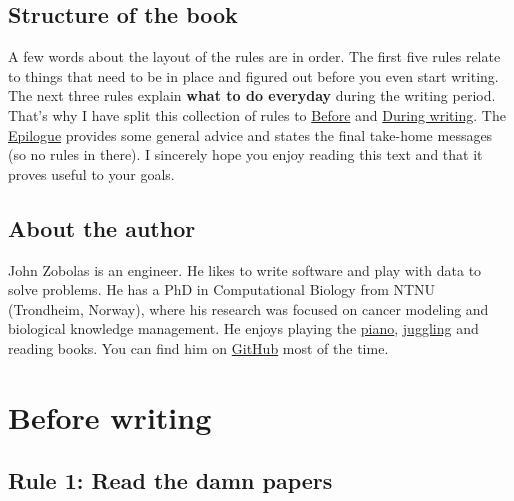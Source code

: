\documentclass[
  12pt,
  oneside]{book}
\begin{document}
\hypertarget{structure-of-the-book}{%
\section*{Structure of the book}\label{structure-of-the-book}}

A few words about the layout of the rules are in order.
The first five rules relate to things that need to be in place and figured out before you even start writing.
The next three rules explain \textbf{what to do everyday} during the writing period.
That's why I have split this collection of rules to \protect\hyperlink{before}{Before} and \protect\hyperlink{during}{During writing}.
The \protect\hyperlink{epilogue}{Epilogue} provides some general advice and states the final take-home messages (so no rules in there).
I sincerely hope you enjoy reading this text and that it proves useful to your goals.

\hypertarget{about-the-author}{%
\section*{About the author}\label{about-the-author}}

John Zobolas is an engineer.
He likes to write software and play with data to solve problems.
He has a PhD in Computational Biology from NTNU (Trondheim, Norway), where his research was focused on cancer modeling and biological knowledge management.
He enjoys playing the \href{https://www.youtube.com/c/JohnZobolas}{piano}, \href{https://www.instagram.com/bblodfon312/}{juggling} and reading books.
You can find him on \href{https://github.com/bblodfon}{GitHub} most of the time.

\hypertarget{before}{%
\chapter*{Before writing}\label{before}}

\hypertarget{rule1}{%
\section*{\texorpdfstring{\textbf{Rule 1:} Read the damn papers}{Rule 1: Read the damn papers}}\label{rule1}}
\end{document}

